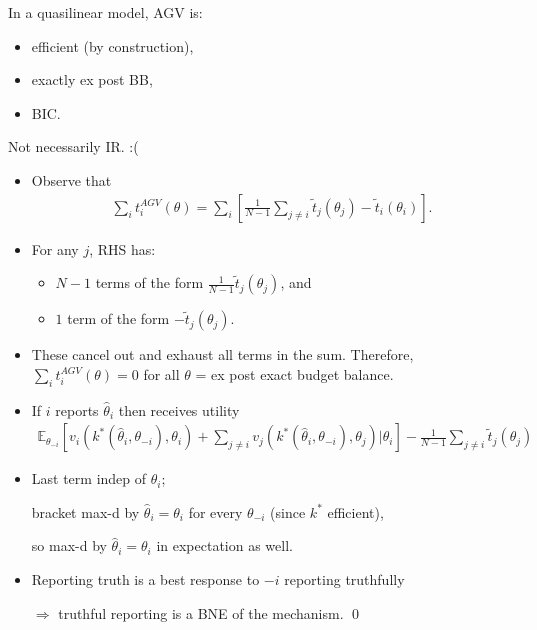 \documentclass[english,handout,10pt]{beamer}		%
\def\lyxframeend{} %
\begin{document}
\begin{theorem}
	In a quasilinear model, AGV is:
	\begin{itemize}
		\item efficient (by construction),
		\item exactly ex post BB,
		\item BIC.
	\end{itemize}
\end{theorem}
Not necessarily IR. :(
\lyxframeend


\begin{itemize}
	\item Observe that
	\vspace{-0.5em}\begin{align*}
	\sum_i t_i^{AGV} (\theta) = \sum_i \left[ \frac{1}{N-1} \sum_{j \neq i} \tilde{t}_j (\theta_j) - \tilde{t}_i (\theta_i) \right].
	\end{align*}
	\item For any $j$, RHS has:
	\begin{itemize}
		\item $N-1$ terms of the form $\frac{1}{N-1} \tilde{t}_j (\theta_j)$, and
		\item $1$ term of the form $-\tilde{t}_j(\theta_j)$.
	\end{itemize}
	\item These cancel out and exhaust all terms in the sum. Therefore, $\sum_i t_i^{AGV} (\theta) = 0$ for all $\theta$ = ex post exact budget balance.
\end{itemize}
\lyxframeend


\begin{itemize}
	\item If $i$ reports $\hat{\theta}_i$ then receives utility
	{\footnotesize 
		\vspace{-0.5em}\begin{align*}
		\mathbb{E}_{\theta_{-i}} \left[ v_i(k^*(\hat{\theta}_i, \theta_{-i}), \theta_i) + \sum_{j \neq i} v_j(k^*(\hat{\theta}_i, \theta_{-i}), \theta_j) | \theta_i \right] - \frac{1}{N-1} \sum_{j \neq i} \tilde{t}_j (\theta_j)
	 	\end{align*}
	}
	\item Last term indep of $\hat{\theta}_i$; 
	
	bracket max-d by $\hat{\theta}_i = \theta_i$ for every $\theta_{-i}$ (since $k^*$ efficient), 
	
	so max-d by $\hat{\theta}_i = \theta_i$ in expectation as well.
	
	\item Reporting truth is a best response to $-i$ reporting truthfully 
	
	$\Rightarrow$ truthful reporting is a BNE of the mechanism. \qed
\end{itemize}
\lyxframeend
\end{document}
